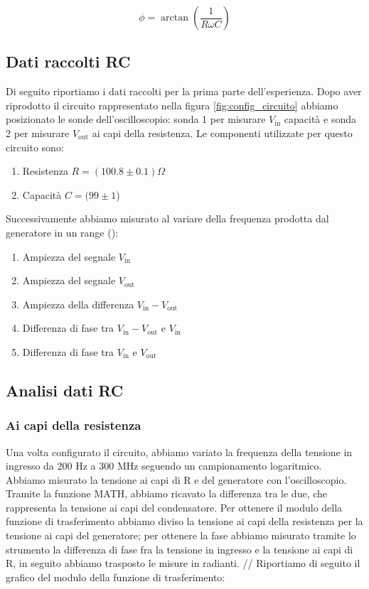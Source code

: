 \documentclass[letterpaper,12pt]{article}
\begin{document}
\begin{equation}
    \label{eq:Fase RC}
    \phi = \arctan\left(\frac{1}{R\omega C}\right)
\end{equation}

    
\newpage


\subsection{Dati raccolti RC}
Di seguito riportiamo i dati raccolti per la prima parte dell'esperienza. Dopo aver riprodotto il circuito rappresentato nella figura \ref{fig:config_circuito} abbiamo posizionato le sonde dell'oscilloscopio: sonda 1 per misurare $V_\text{in}$ capacità e sonda 2 per misurare $V_\text{out}$ ai capi della resistenza. Le componenti utilizzate per questo circuito sono:

\begin{enumerate}
    \item Resistenza $R = (100.8\pm0.1)\Omega$
    \item Capacità $C = (99\pm1$) 
\end{enumerate}
Successivamente abbiamo misurato al variare della frequenza prodotta dal generatore in un range ():
\begin{enumerate}
    \item Ampiezza del segnale $V_\text{in}$
    \item Ampiezza del segnale $V_\text{out}$
    \item Ampiezza della differenza $V_\text{in} - V_\text{out}$
    \item Differenza di fase tra $V_\text{in} - V_\text{out}$ e $V_\text{in}$
    \item Differenza di fase tra $V_\text{in}$ e $V_\text{out}$
\end{enumerate}



\newpage
\subsection{Analisi dati RC}

\subsubsection{Ai capi della resistenza}

Una volta configurato il circuito, abbiamo variato la frequenza della tensione in ingresso da 200 Hz a 300 MHz seguendo un campionamento logaritmico. Abbiamo misurato la tensione ai capi di R e del generatore con l'oscilloscopio. Tramite la funzione MATH, abbiamo ricavato la differenza tra le due, che rappresenta la tensione ai capi del condensatore. Per ottenere il modulo della funzione di trasferimento abbiamo diviso la tensione ai capi della resistenza per la tensione ai capi del generatore; per ottenere la fase abbiamo misurato tramite lo strumento la differenza di fase fra la tensione in ingresso e la tensione ai capi di R, in seguito abbiamo trasposto le misure in radianti. //
Riportiamo di seguito il grafico del modulo della funzione di trasferimento:
\end{document}
